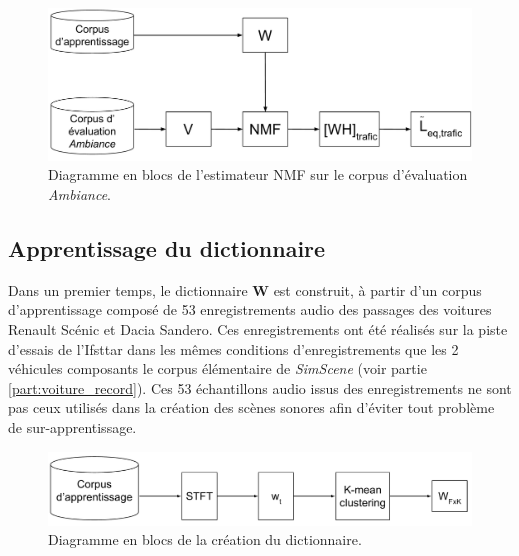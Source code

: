 \begin{figure}[ht]
\centering
\includegraphics[width=0.7\linewidth]{./figures/NMF/NMF_ambiance.pdf}
\caption{Diagramme en blocs de l'estimateur NMF sur le corpus d'évaluation \textit{Ambiance}.}
\label{fig:nmf_ambiance}
\end{figure}


\subsection{Apprentissage du dictionnaire} 

Dans un premier temps, le dictionnaire $\mathbf{W}$ est construit, à partir d'un corpus d'apprentissage composé de 53  enregistrements audio des passages des voitures Renault Scénic et Dacia Sandero. Ces enregistrements ont été réalisés sur la piste d'essais de l'Ifsttar dans les mêmes conditions d'enregistrements que les 2 véhicules composants le corpus élémentaire de \textit{SimScene} (voir partie \ref{part:voiture_record}). Ces 53 échantillons audio issus des enregistrements ne sont pas ceux utilisés dans la création des scènes sonores afin d'éviter tout problème de sur-apprentissage.

\begin{figure}[hbtp]
\centering
\includegraphics[width=.9\linewidth]{./figures/NMF/creation_dictionaire.pdf}
\caption{Diagramme en blocs de la création du dictionnaire.}
\label{fig:creation_W}
\end{figure}



